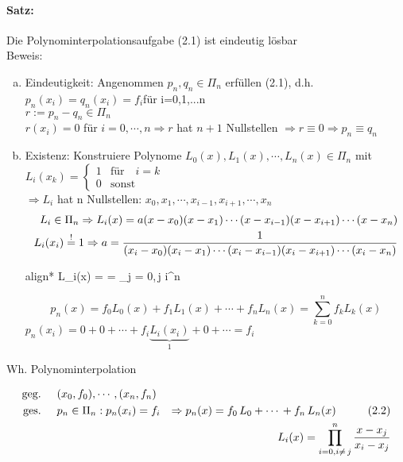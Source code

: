 \paragraph{Satz:} Die Polynominterpolationsaufgabe (2.1) ist eindeutig lösbar\\
Beweis:
\begin{enumerate}[(a)]
  \item Eindeutigkeit: Angenommen $p_n, q_n \in \Pi_n$ erfüllen (2.1), d.h. $p_n(x_i)=q_n(x_i)=f_i $für i=0,1,...n\\
    $r := p_n - q_n \in \Pi_n$ \\
    $r(x_i) = 0$ für $i = 0, \cdots, n \Rightarrow r$ hat $n + 1$ Nullstellen
    $\Rightarrow r \equiv 0 \Rightarrow p_n \equiv q_n$
  \item Existenz: Konstruiere Polynome $L_0(x), L_1(x), \cdots, L_n(x) \in \Pi_n$ mit\\
    $L_i(x_k)=\begin{cases} 1 & \mbox{für } \mbox{ $i = k$} \\ 
      0 & \mbox{sonst} \end{cases}$ \\
    $\Rightarrow L_i$ hat n Nullstellen: $x_0, x_1, \cdots, x_{i-1}, x_{i+1}, \cdots, x_n$
		\begin{align*}    
		L_i \in \Pi_n \Rightarrow L_i(x) = a(x-x_0)(x-x_1)\cdots(x-x_{i-1})(x-x_{i+1})\cdots(x-x_n)\\
    L_i(x_i) \overset{!}{=} 1 \Rightarrow
      a = \frac{1}{(x_i-x_0)(x_i-x_1)\cdots(x_i-x_{i-1})(x_i-x_{i+1})\cdots(x_i-x_n)}\\
    \end{align*}
		\begin{empheq}[innerbox=\fbox,right=\Leftarrow{\text{LAGRANGE-POLYNOME}}]{align*}
		\Rightarrow L_i(x) =  = 
      \prod\limits_{j = 0,\,j \neq i}^n  \\
		\end{empheq}
    \begin{equation*}
      \tag{2.2}
      p_n(x) = f_0 L_0(x) + f_1 L_1(x) + \cdots + f_n L_n(x) = 
      \sum\limits_{k = 0}^n f_k L_k(x)
    \end{equation*}
    $p_n(x_i) = 0 + 0 + \cdots + f_i\underbrace{L_i(x_i)}_{1} + 0 + \cdots = f_i$\\
\end{enumerate}

Wh. Polynominterpolation

\begin{align*}
\text{geg.} \hspace{0.5cm} & (x_0,f_0),\cdots\,,(x_n,f_n) \\
\text{ges.} \hspace{0.5cm} & p_n \in \Pi_n:p_n(x_i)=f_i & \Rightarrow p_n(x) = f_0\,L_0+\cdots\,+f_n\,L_n(x) \hspace{1cm} (2.2)\\
& & L_i(x)=\prod\limits_{i=0,i\neq\,j}^n \frac{x-x_j}{x_i-x_j}
\end{align*}


